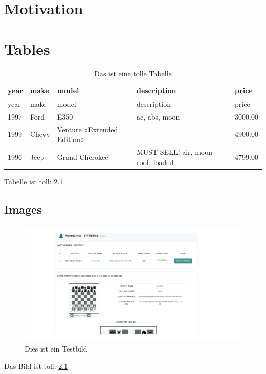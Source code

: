 \hypertarget{motivation}{%
\chapter{Motivation}\label{motivation}}

\hypertarget{tables}{%
\chapter{Tables}\label{tables}}

\begin{longtable}[]{@{}lllll@{}}
\caption{Das ist eine tolle Tabelle
\label{Das_ist_eine_tolle_Tabelle.csv}}\tabularnewline
\toprule
year & make & model & description & price\tabularnewline
\midrule
\endfirsthead
\toprule
year & make & model & description & price\tabularnewline
\midrule
\endhead
1997 & Ford & E350 & ac, abs, moon & 3000.00\tabularnewline
1999 & Chevy & Venture «Extended Edition» & & 4900.00\tabularnewline
1996 & Jeep & Grand Cherokee & MUST SELL! air, moon roof, loaded &
4799.00\tabularnewline
\bottomrule
\end{longtable}

Tabelle ist toll: \ref{Das_ist_eine_tolle_Tabelle.csv}

\hypertarget{images}{%
\section{Images}\label{images}}

\begin{figure}
\centering
\includegraphics{./generated_images/border_Dies_ist_ein_Testbild.png}
\caption{Dies ist ein Testbild \label{Dies_ist_ein_Testbild.png}}
\end{figure}

Das Bild ist toll: \ref{Dies_ist_ein_Testbild.png}

